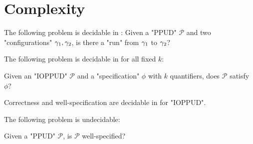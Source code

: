 \section{Complexity}
\label{sec:complexity}

\begin{proposition}
	The following problem is decidable in \pspace:
	Given a "PPUD" $\mathcal{P}$ and two "configurations" $\gamma_1, \gamma_2$, is there a "run" from $\gamma_1$ to $\gamma_2$?
\end{proposition}




\begin{theorem}
	The following problem is decidable in \exps for all fixed $k$:
	
	Given an "IOPPUD" $\mathcal{P}$ and a "specification" $\phi$ with $k$ quantifiers, does $\mathcal{P}$ satisfy $\phi$?
\end{theorem}

\begin{corollary}
	Correctness and well-specification are decidable in \exps for "IOPPUD".
\end{corollary}

\begin{theorem}
	The following problem is undecidable:
	
	Given a "PPUD" $\mathcal{P}$, is $\mathcal{P}$ well-specified?
\end{theorem}
